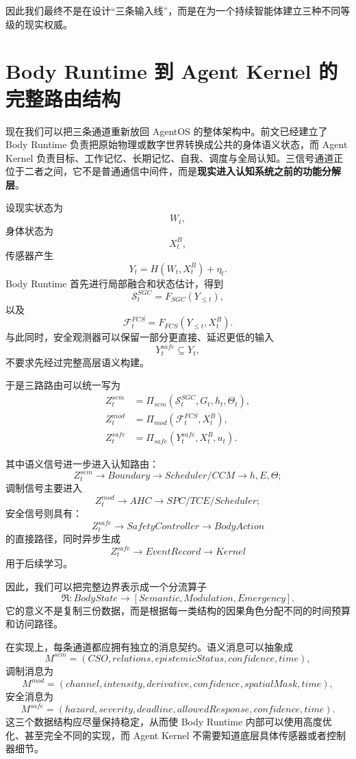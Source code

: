 因此我们最终不是在设计“三条输入线”，而是在为一个持续智能体建立三种不同等级的现实权威。

\section{Body Runtime 到 Agent Kernel 的完整路由结构}
\label{sec:body-kernel-routing}

现在我们可以把三条通道重新放回 AgentOS 的整体架构中。前文已经建立了 Body Runtime 负责把原始物理或数字世界转换成公共的身体语义状态，而 Agent Kernel 负责目标、工作记忆、长期记忆、自我、调度与全局认知。三信号通道正位于二者之间，它不是普通通信中间件，而是\textbf{现实进入认知系统之前的功能分解层}。

设现实状态为
\[
W_t,
\]
身体状态为
\[
X_t^B,
\]
传感器产生
\[
Y_t
=
H(W_t,X_t^B)+\eta_t.
\]
Body Runtime 首先进行局部融合和状态估计，得到
\[
\mathcal S_t^{SGC}
=
F_{SGC}(Y_{\leq t}),
\]
以及
\[
\mathcal F_t^{FCS}
=
F_{FCS}(Y_{\leq t},X_t^B).
\]
与此同时，安全观测器可以保留一部分更直接、延迟更低的输入
\[
Y_t^{safe}
\subseteq
Y_t,
\]
不要求先经过完整高层语义构建。

于是三路路由可以统一写为
\[
\begin{aligned}
Z_t^{sem}
&=
\Pi_{sem}
(\mathcal S_t^{SGC},
G_t,h_t,\Theta_t),
\\
Z_t^{mod}
&=
\Pi_{mod}
(\mathcal F_t^{FCS},
X_t^B),
\\
Z_t^{safe}
&=
\Pi_{safe}
(Y_t^{safe},
X_t^B,u_t).
\end{aligned}
\]

其中语义信号进一步进入认知路由：
\[
Z_t^{sem}
\rightarrow
Boundary
\rightarrow
Scheduler/CCM
\rightarrow
h,E,\Theta;
\]
调制信号主要进入
\[
Z_t^{mod}
\rightarrow
AHC
\rightarrow
SPC/TCE/Scheduler;
\]
安全信号则具有：
\[
Z_t^{safe}
\rightarrow
SafetyController
\rightarrow
BodyAction
\]
的直接路径，同时异步生成
\[
Z_t^{safe}
\rightarrow
EventRecord
\rightarrow
Kernel
\]
用于后续学习。

因此，我们可以把完整边界表示成一个分流算子
\[
\mathfrak R:
BodyState
\longrightarrow
\left[
Semantic,
Modulation,
Emergency
\right].
\]
它的意义不是复制三份数据，而是根据每一类结构的因果角色分配不同的时间预算和访问路径。

在实现上，每条通道都应拥有独立的消息契约。语义消息可以抽象成
\[
M^{sem}
=
(
CSO,
relations,
epistemicStatus,
confidence,
time
),
\]
调制消息为
\[
M^{mod}
=
(
channel,
intensity,
derivative,
confidence,
spatialMask,
time
),
\]
安全消息为
\[
M^{safe}
=
(
hazard,
severity,
deadline,
allowedResponse,
confidence,
time
).
\]
这三个数据结构应尽量保持稳定，从而使 Body Runtime 内部可以使用高度优化、甚至完全不同的实现，而 Agent Kernel 不需要知道底层具体传感器或者控制器细节。

